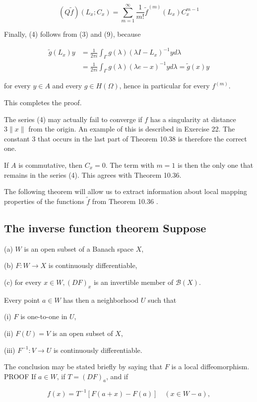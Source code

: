 \documentclass[10pt]{article}
\begin{document}
$$
(Q \tilde{f})\left(L_{x} ; C_{x}\right)=\sum_{m=1}^{\infty} \frac{1}{m !} \tilde{f}^{(m)}\left(L_{x}\right) C_{x}^{m-1}
$$

Finally, (4) follows from (3) and (9), because

$$
\begin{aligned}
\tilde{g}\left(L_{x}\right) y & =\frac{1}{2 \pi i} \int_{\Gamma} g(\lambda)\left(\lambda I-L_{x}\right)^{-1} y d \lambda \\
& =\frac{1}{2 \pi i} \int_{\Gamma} g(\lambda)(\lambda e-x)^{-1} y d \lambda=\tilde{g}(x) y
\end{aligned}
$$

for every $y \in A$ and every $g \in H(\Omega)$, hence in particular for every $f^{(m)}$.

This completes the proof.

The series (4) may actually fail to converge if $f$ has a singularity at distance $3\|x\|$ from the origin. An example of this is described in Exercise 22. The constant 3 that occurs in the last part of Theorem 10.38 is therefore the correct one.

If $A$ is commutative, then $C_{x}=0$. The term with $m=1$ is then the only one that remains in the series (4). This agrees with Theorem 10.36.

The following theorem will allow us to extract information about local mapping properties of the functions $\tilde{f}$ from Theorem 10.36 .

\subsection{The inverse function theorem Suppose}
(a) $W$ is an open subset of a Banach space $X$,

(b) $F: W \rightarrow X$ is continuously differentiable,

(c) for every $x \in W,(D F)_{x}$ is an invertible member of $\mathscr{B}(X)$.

Every point $a \in W$ has then a neighborhood $U$ such that

(i) $F$ is one-to-one in $U$,

(ii) $F(U)=V$ is an open subset of $X$,

(iii) $F^{-1}: V \rightarrow U$ is continuously differentiable.

The conclusion may be stated briefly by saying that $F$ is a local diffeomorphism. PROOF If $a \in W$, if $T=(D F)_{a}$, and if

$$
f(x)=T^{-1}[F(a+x)-F(a)] \quad(x \in W-a),
$$
\end{document}
